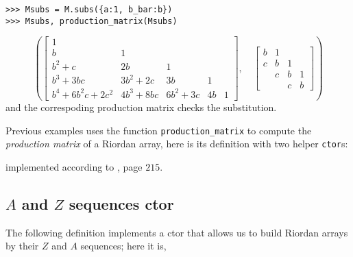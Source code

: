 \begin{example}
\begin{verbatim}
>>> Msubs = M.subs({a:1, b_bar:b})
>>> Msubs, production_matrix(Msubs)
\end{verbatim}
\begin{displaymath}
\left ( \left[\begin{matrix}1 &   &   &   &  \\b & 1 &   &   &  \\b^{2} + c & 2 b & 1 &   &  \\b^{3} + 3 b c & 3 b^{2} + 2 c & 3 b & 1 &  \\b^{4} + 6 b^{2} c + 2 c^{2} & 4 b^{3} + 8 b c & 6 b^{2} + 3 c & 4 b & 1\end{matrix}\right], \quad \left[\begin{matrix}b & 1 &   &  \\c & b & 1 &  \\  & c & b & 1\\  &   & c & b\end{matrix}\right]\right )
\end{displaymath}
and the correspoding production matrix checks the substitution.
\end{example}

Previous examples uses the function \verb|production_matrix| to compute the
\textit{production matrix} \citep{DEUTSCH2005101,Deutsch2009} of a Riordan
array, here is its definition with two helper \verb|ctor|s:


implemented according to \citep{barry2017riordan}, page $215$.

\subsection{$A$ and $Z$ sequences ctor}

The following definition implements a ctor that allows us to build Riordan
arrays by their $Z$ and $A$ sequences; here it is,


